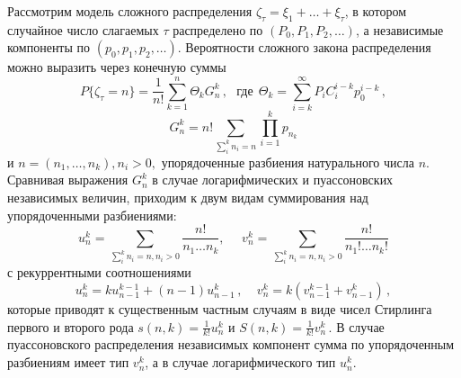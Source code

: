 \documentclass{math-mech-sci}
\begin{document}
Рассмотрим модель сложного распределения  $\zeta_\tau=\xi_1+\ldots+\xi_\tau$, в котором случайное число слагаемых $\tau$ распределено по $(P_0,P_1,P_2,\ldots)$,  а независимые компоненты по $(p_0, p_1,p_2,\ldots)$. 
Вероятности сложного закона распределения можно выразить через  конечную суммы
\[
	P\{\zeta_\tau=n\}=\frac 1{n!}\sum\limits_{k=1}^n \Theta_k G_n^k\,,~~~
	\mbox{где}~~
	\Theta_k=\sum\limits_{i=k}^\infty P_iC_i^{i-k} p_0^{i-k}\,,
	\]
	\[
	G_n^k=n!\sum\limits_{\sum_i^k n_i=n}\prod\limits_{i=1}^kp_{n_k}
	\]
	 и $n=(n_1,\ldots,n_k), n_i>0,$ 
упорядоченные разбиения  натурального числа $n$.  
%
%
Сравнивая  выражения $G_n^k$ в случае  логарифмических и  пуассоновских независимых величин, приходим  к двум видам суммирования над упорядоченными разбиениями:
%
%	
%	
%
$$
	u_n^k=\sum\limits_{ \sum_i^k n_i=n,n_i>0 } \frac{n!}{ n_1\ldots n_k},~~~~~~
		v_n^k=\sum\limits_{ \sum_i^kn_i=n,n_i>0} \frac{n!}{n_1!\ldots n_k!}
$$
	с рекуррентными соотношениями 
	$$
	u_n^k=ku_{n-1}^{k-1} +(n-1)u_{n-1}^k\,,~~~~~v_n^k=k(v_{n-1}^{k-1} +v_{n-1}^k)\,,
	$$
	которые приводят к 
существенным частным случаям в виде чисел Стирлинга первого и второго рода
$
s(n,k)=\frac 1{k!}u_n^k $  и  $S(n,k)=\frac 1{k!}v_n^k\,.
$
В случае пуассоновского распределения независимых компонент  сумма по упорядоченным разбиениям имеет тип  $v_n^k$, а в случае логарифмического  тип $u_n^k$. 
\end{document}

